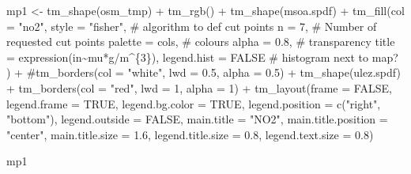 \documentclass[
  letterpaper,
  DIV=11,
  numbers=noendperiod]{scrreprt}
\newenvironment{Shaded}{\begin{snugshade}}{\end{snugshade}}
\newcommand{\AttributeTok}[1]{\textcolor[rgb]{0.40,0.45,0.13}{#1}}
\newcommand{\CommentTok}[1]{\textcolor[rgb]{0.37,0.37,0.37}{#1}}
\newcommand{\ConstantTok}[1]{\textcolor[rgb]{0.56,0.35,0.01}{#1}}
\newcommand{\DecValTok}[1]{\textcolor[rgb]{0.68,0.00,0.00}{#1}}
\newcommand{\FloatTok}[1]{\textcolor[rgb]{0.68,0.00,0.00}{#1}}
\newcommand{\FunctionTok}[1]{\textcolor[rgb]{0.28,0.35,0.67}{#1}}
\newcommand{\NormalTok}[1]{\textcolor[rgb]{0.00,0.23,0.31}{#1}}
\newcommand{\OtherTok}[1]{\textcolor[rgb]{0.00,0.23,0.31}{#1}}
\newcommand{\SpecialCharTok}[1]{\textcolor[rgb]{0.37,0.37,0.37}{#1}}
\newcommand{\StringTok}[1]{\textcolor[rgb]{0.13,0.47,0.30}{#1}}
\begin{document}
\begin{Shaded}
\begin{Highlighting}[]
\NormalTok{mp1 }\OtherTok{\textless{}{-}}  \FunctionTok{tm\_shape}\NormalTok{(osm\_tmp) }\SpecialCharTok{+} \FunctionTok{tm\_rgb}\NormalTok{() }\SpecialCharTok{+}
  \FunctionTok{tm\_shape}\NormalTok{(msoa.spdf) }\SpecialCharTok{+} 
  \FunctionTok{tm\_fill}\NormalTok{(}\AttributeTok{col =} \StringTok{"no2"}\NormalTok{, }
          \AttributeTok{style =} \StringTok{"fisher"}\NormalTok{, }\CommentTok{\# algorithm to def cut points}
          \AttributeTok{n =} \DecValTok{7}\NormalTok{, }\CommentTok{\# Number of requested cut points}
          \AttributeTok{palette =}\NormalTok{ cols, }\CommentTok{\# colours}
          \AttributeTok{alpha =} \FloatTok{0.8}\NormalTok{, }\CommentTok{\# transparency }
          \AttributeTok{title =} \FunctionTok{expression}\NormalTok{(}\StringTok{\textquotesingle{}in\textquotesingle{}}\SpecialCharTok{\textasciitilde{}}\NormalTok{mu}\SpecialCharTok{*}\StringTok{\textquotesingle{}g\textquotesingle{}}\SpecialCharTok{/}\NormalTok{m}\SpecialCharTok{\^{}}\NormalTok{\{}\DecValTok{3}\NormalTok{\}), }
          \AttributeTok{legend.hist =} \ConstantTok{FALSE} \CommentTok{\# histogram next to map?}
\NormalTok{          ) }\SpecialCharTok{+}
  \CommentTok{\#tm\_borders(col = "white", lwd = 0.5, alpha = 0.5) +}
  \FunctionTok{tm\_shape}\NormalTok{(ulez.spdf) }\SpecialCharTok{+}
  \FunctionTok{tm\_borders}\NormalTok{(}\AttributeTok{col =} \StringTok{"red"}\NormalTok{, }\AttributeTok{lwd =} \DecValTok{1}\NormalTok{, }\AttributeTok{alpha =} \DecValTok{1}\NormalTok{) }\SpecialCharTok{+}
  \FunctionTok{tm\_layout}\NormalTok{(}\AttributeTok{frame =} \ConstantTok{FALSE}\NormalTok{,}
            \AttributeTok{legend.frame =} \ConstantTok{TRUE}\NormalTok{, }\AttributeTok{legend.bg.color =} \ConstantTok{TRUE}\NormalTok{,}
            \AttributeTok{legend.position =} \FunctionTok{c}\NormalTok{(}\StringTok{"right"}\NormalTok{, }\StringTok{"bottom"}\NormalTok{),}
            \AttributeTok{legend.outside =} \ConstantTok{FALSE}\NormalTok{,}
            \AttributeTok{main.title =} \StringTok{"NO2"}\NormalTok{, }
            \AttributeTok{main.title.position =} \StringTok{"center"}\NormalTok{,}
            \AttributeTok{main.title.size =} \FloatTok{1.6}\NormalTok{,}
            \AttributeTok{legend.title.size =} \FloatTok{0.8}\NormalTok{,}
            \AttributeTok{legend.text.size =} \FloatTok{0.8}\NormalTok{)}

\NormalTok{mp1}
\end{Highlighting}
\end{Shaded}
\end{document}
